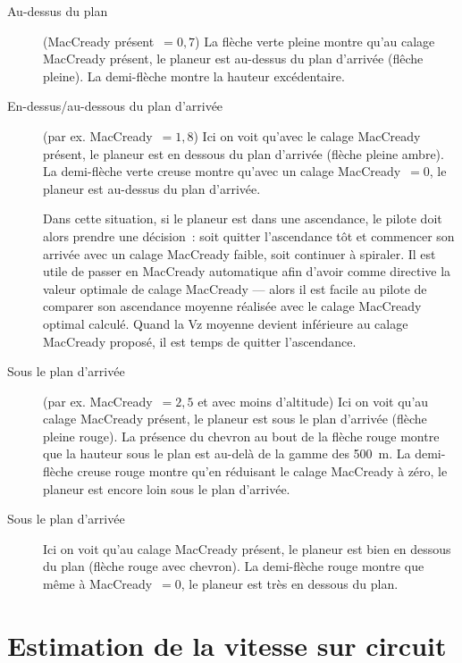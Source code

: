 \begin{description}
\item[Au-dessus du plan] (MacCready présent~$=0,7$)
La flèche verte pleine montre qu'au calage MacCready présent, le planeur est au-dessus du plan d'arrivée (flêche pleine).
La demi-flèche montre la hauteur excédentaire.

\item[En-dessus/au-dessous du plan d'arrivée] (par ex. MacCready~$=1,8$)
Ici on voit qu'avec le calage MacCready présent, le planeur est en dessous du plan d'arrivée (flèche pleine ambre).
La demi-flèche verte creuse montre qu'avec un calage MacCready~$=0$, le planeur est au-dessus du plan d'arrivée.

Dans cette situation, si le planeur est dans une ascendance, le pilote doit alors prendre une décision~: soit quitter l'ascendance tôt et commencer son arrivée avec un calage MacCready faible, soit continuer à spiraler.
Il est utile de passer en MacCready automatique afin d'avoir comme directive la valeur optimale de calage MacCready --- alors il est facile au pilote de comparer son ascendance moyenne réalisée avec le calage MacCready optimal calculé.
Quand la Vz moyenne devient inférieure au calage MacCready proposé, il est temps de quitter l'ascendance.

\item[Sous le plan d'arrivée] (par ex. MacCready~$=2,5$ et avec moins d'altitude)
Ici on voit qu'au calage MacCready présent, le planeur est sous le plan d'arrivée (flèche pleine rouge).
La présence du chevron au bout de la flèche rouge montre que la hauteur sous le plan est au-delà de la gamme des 500~m.
La demi-flèche creuse rouge montre qu'en réduisant le calage MacCready à zéro, le planeur est encore loin sous le plan d'arrivée.

\item[Sous le plan d'arrivée]
Ici on voit qu'au calage MacCready présent, le planeur est bien en dessous du plan (flèche rouge avec chevron).
La demi-flèche rouge montre que même à MacCready~$=0$, le planeur est très en dessous du plan.


\end{description}


\section{Estimation de la vitesse sur circuit}\label{sec:task-speed-estim}

